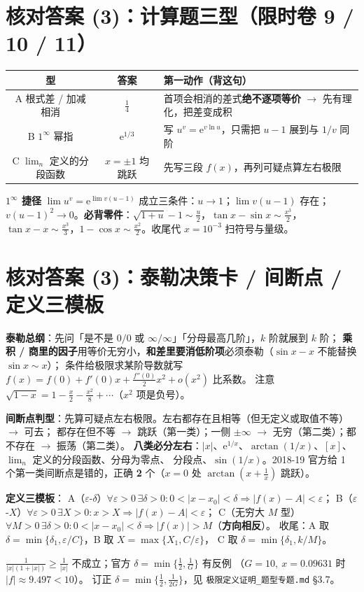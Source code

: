 \documentclass[10pt,a4paper]{ctexart}
\newcommand{\eps}{\varepsilon}
\newcommand{\abs}[1]{\left\lvert #1\right\rvert}
\newcommand{\ee}{\mathrm{e}}
\begin{document}
\clearpage

\section*{核对答案 (3)：计算题三型（限时卷 9 / 10 / 11）}
\small\setlength{\tabcolsep}{4pt}
\begin{tabularx}{\linewidth}{c|c|X}
\toprule
型 & 答案 & 第一动作（背这句） \\
\midrule
A 根式差 / 加减相消 & $\frac14$ & 首项会相消的差式\textbf{绝不逐项等价} $\to$ 先有理化，把差变成积 \\
B $1^\infty$ 幂指 & $\ee^{1/3}$ & 写 $u^v=\ee^{v\ln u}$，只需把 $u-1$ 展到与 $1/v$ 同阶 \\
C $\lim_n$ 定义的分段函数 & $x=\pm1$ 均跳跃 & 先写三段 $f(x)$，再列可疑点算左右极限 \\
\bottomrule
\end{tabularx}
\normalsize\smallskip
\textbf{$1^\infty$ 捷径} $\lim u^v=\ee^{\lim v(u-1)}$ 成立三条件：$u\to1$；$\lim v(u-1)$ 存在；
$v(u-1)^2\to0$。\textbf{必背零件}：$\sqrt{1+u}-1\sim\frac u2$，$\tan x-\sin x\sim\frac{x^3}{2}$，
$\tan x-x\sim\frac{x^3}{3}$，$1-\cos x\sim\frac{x^2}{2}$。收尾代 $x=10^{-3}$ 扫符号与量级。

\section*{核对答案 (3)：泰勒决策卡 / 间断点 / 定义三模板}
\textbf{泰勒总纲}：先问「是不是 $0/0$ 或 $\infty/\infty$」「分母最高几阶」，$k$ 阶就展到 $k$ 阶；
\textbf{乘积 / 商里的因子}用等价无穷小，\textbf{和差里要消低阶项}必须泰勒（$\sin x-x$ 不能替换 $\sin x\sim x$）；
条件给极限求某阶导数就写 $f(x)=f(0)+f'(0)x+\frac{f''(0)}2x^2+o(x^2)$ 比系数。
注意 $\sqrt{1-x}=1-\frac x2-\frac{x^2}{8}+\cdots$（$x^2$ 项是负号）。
\vspace{0.2em}

\textbf{间断点判型}：先算可疑点左右极限。左右都存在且相等（但无定义或取值不等）$\to$ 可去；
都存在但不等 $\to$ 跳跃（第一类）；一侧 $\pm\infty$ $\to$ 无穷（第二类）；都不存在 $\to$ 振荡（第二类）。
\textbf{八类必分左右}：$\abs x$、$\ee^{1/x}$、$\arctan(1/x)$、$[x]$、$\lim_n$ 定义的分段函数、分母为零点、
分段点、$\sin(1/x)$。2018-19 官方给 1 个第一类间断点是错的，正确 \textbf{2} 个（$x=0$ 处 $\arctan(x+\frac1x)$ 跳跃）。
\vspace{0.2em}

\textbf{定义三模板}：
A（$\eps$-$\delta$）$\forall\eps>0\,\exists\delta>0:0<\abs{x-x_0}<\delta\Rightarrow\abs{f(x)-A}<\eps$；
B（$\eps$-$X$）$\forall\eps>0\,\exists X>0:x>X\Rightarrow\abs{f(x)-A}<\eps$；
C（无穷大 $M$ 型）$\forall M>0\,\exists\delta>0:0<\abs{x-x_0}<\delta\Rightarrow\abs{f(x)}>M$（\textbf{方向相反}）。
收尾：A 取 $\delta=\min\{\delta_1,\eps/C\}$，B 取 $X=\max\{X_1,C/\eps\}$，
C 取 $\delta=\min\{\delta_1,k/M\}$。
\begin{warnbox}[2024-25 第 11 题答案册放缩方向错]
$\frac1{|x|(1+|x|)}\ge\frac1{|x|}$ 不成立；官方 $\delta=\min\{\frac12,\frac1G\}$ 有反例
（$G=10,\ x=0.09631$ 时 $\abs f\approx9.497<10$）。
订正 \textbf{$\delta=\min\{\frac12,\frac1{2G}\}$}，见 \texttt{极限定义证明\_题型专题.md} §3.7。
\end{warnbox}
\end{document}

